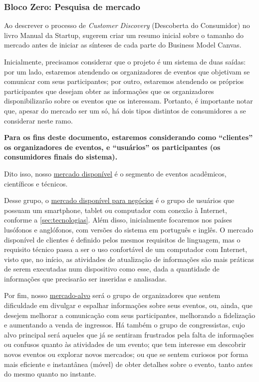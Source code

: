 \documentclass[12pt,a4paper,twoside,hyphens,english,brazil]{abntex2}
\begin{document}
\subsubsection*{Bloco Zero: Pesquisa de mercado}
\label{sec:lean:mercado}
Ao descrever o processo de \textit{Customer Discovery} (Descoberta do Consumidor) no livro Manual da Startup\cite{manual-startup},  sugerem criar um resumo inicial sobre o tamanho do mercado antes de iniciar as sínteses de cada parte do Business Model Canvas.

Inicialmente, precisamos considerar que o projeto é um sistema de duas saídas: por um lado, estaremos atendendo os organizadores de eventos que objetivam se comunicar com seus participantes; por outro, estaremos atendendo os próprios participantes que desejam obter as informações que os organizadores disponibilizarão sobre os eventos que os interessam. Portanto, é importante notar que, apesar do mercado ser um só, há dois tipos distintos de consumidores a se considerar neste ramo.

\textbf{Para os fins deste documento, estaremos considerando como ``clientes'' os organizadores de eventos, e ``usuários'' os participantes (os consumidores finais do sistema).}

Dito isso, nosso \underline{mercado disponível} é o segmento de eventos acadêmicos, científicos e técnicos.

Desse grupo, o \underline{mercado disponível para negócios} é o grupo de usuários que possuam um smartphone, tablet ou computador com conexão à Internet, conforme a \autoref{sec:tecnologias}. Além disso, inicialmente focaremos nos países lusófonos e anglófonos, com versões do sistema em português e inglês. O mercado disponível de clientes é definido pelos mesmos requisitos de linguagem, mas o requisito técnico passa a ser o uso confortável de um computador com Internet, visto que, no início, as atividades de atualização de informações são mais práticas de serem executadas num dispositivo como esse, dada a quantidade de informações que precisarão ser inseridas e analisadas.

Por fim, nosso \underline{mercado-alvo} será o grupo de organizadores que sentem dificuldade em divulgar e espalhar informações sobre seus eventos, ou, ainda, que desejem melhorar a comunicação com seus participantes, melhorando a fidelização e aumentando a venda de ingressos. Há também o grupo de congressistas, cujo alvo principal será aqueles que já se sentiram frustrados pela falta de informações ou confusos quanto às atividades de um evento; que tem interesse em descobrir novos eventos ou explorar novos mercados; ou que se sentem curiosos por forma mais eficiente e instantânea (móvel) de obter detalhes sobre o evento, tanto antes do mesmo quanto no instante.
\end{document}
